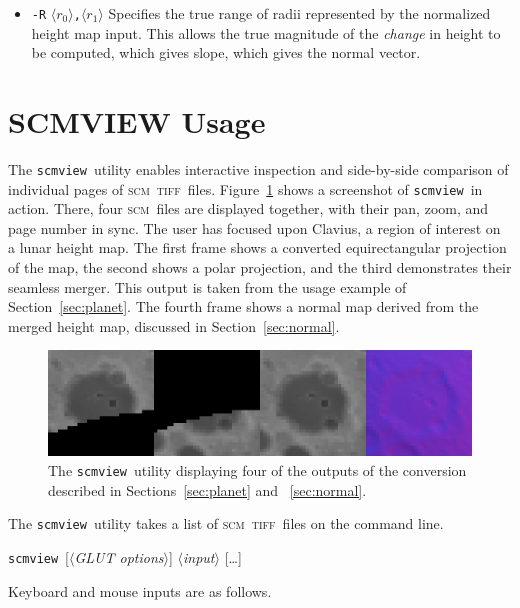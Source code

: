 \documentclass[oneside,10pt]{memoir}
\newcommand{\scm}     {\textsc{scm}}
\newcommand{\tiff}    {\textsc{tiff}}
\newcommand{\scmview} {\texttt{scmview}}
\newcommand{\inangles}[1]{$\langle$#1$\rangle$}
\newenvironment{optionlist}
  {\setlength{\leftmargini}{1in}\begin{itemize}}{\end{itemize}}
\begin{document}
\begin{Spacing}{1.1}
\begin{optionlist}
\item[\texttt{-R} \inangles{$r_0$}\texttt{,}\inangles{$r_1$}] Specifies the true range of radii represented by the normalized height map input. This allows the true magnitude of the \emph{change} in height to be computed, which gives slope, which gives the normal vector.
\end{optionlist}

\section{SCMVIEW Usage}

The \scmview\ utility enables interactive inspection and side-by-side comparison of individual pages of \scm\ \tiff\ files. Figure~\ref{fig:scmview} shows a screenshot of \scmview\ in action. There, four \scm\ files are displayed together, with their pan, zoom, and page number in sync. The user has focused upon Clavius, a region of interest on a lunar height map. The first frame shows a converted equirectangular projection of the map, the second shows a polar projection, and the third demonstrates their seamless merger. This output is taken from the usage example of Section~\ref{sec:planet}. The fourth frame shows a normal map derived from the merged height map, discussed in Section~\ref{sec:normal}.

\begin{figure}
  \centering
  \includegraphics[width=\textwidth]{fig/scmview.png}
  \caption{The \scmview\ utility displaying four of the outputs of the conversion described in Sections~\ref{sec:planet} and ~\ref{sec:normal}.}
  \label{fig:scmview}
\end{figure}

The \scmview\ utility takes a list of \scm\ \tiff\ files on the command line.

\bigskip\noindent\scmview\ [\inangles{\textit{GLUT options}}] \inangles{\textit{input}} [\ldots]

\bigskip Keyboard and mouse inputs are as follows.


\end{Spacing}
\end{document}
